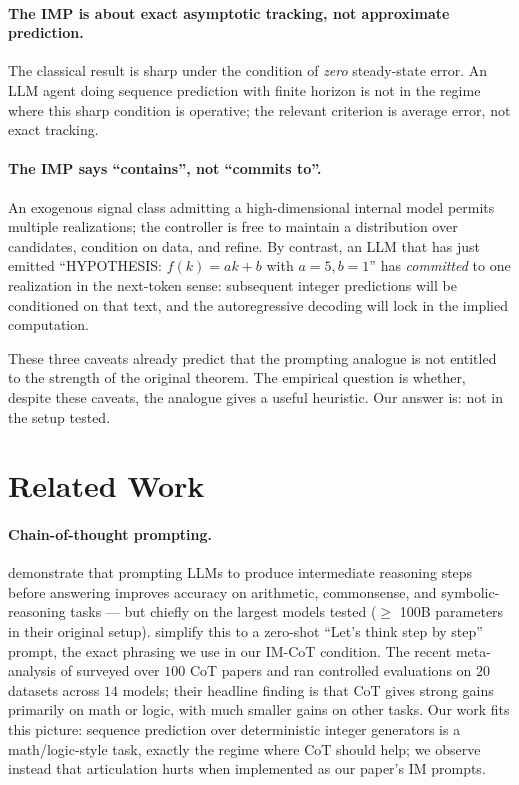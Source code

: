 \documentclass[11pt]{article}
\begin{document}
\paragraph{The IMP is about exact asymptotic tracking, not
approximate prediction.}  The classical result is sharp under the
condition of \emph{zero} steady-state error.  An LLM agent doing
sequence prediction with finite horizon is not in the regime where
this sharp condition is operative; the relevant criterion is
average error, not exact tracking.

\paragraph{The IMP says ``contains'', not ``commits to''.}  An
exogenous signal class admitting a high-dimensional internal model
permits multiple realizations; the controller is free to maintain a
distribution over candidates, condition on data, and refine.  By
contrast, an LLM that has just emitted ``HYPOTHESIS:
$f(k) = ak + b$ with $a = 5, b = 1$'' has \emph{committed} to one
realization in the next-token sense: subsequent integer predictions
will be conditioned on that text, and the autoregressive decoding
will lock in the implied computation.

These three caveats already predict that the prompting analogue is
not entitled to the strength of the original theorem.  The empirical
question is whether, despite these caveats, the analogue gives a
useful heuristic.  Our answer is: not in the setup tested.

\section{Related Work}
\label{sec:related}

\paragraph{Chain-of-thought prompting.}
\citet{wei2022chain} demonstrate that prompting LLMs to produce
intermediate reasoning steps before answering improves accuracy on
arithmetic, commonsense, and symbolic-reasoning tasks --- but
chiefly on the largest models tested ($\geq$ 100B parameters in
their original setup).  \citet{kojima2022zero} simplify this to a
zero-shot ``Let's think step by step'' prompt, the exact phrasing
we use in our IM-CoT condition.  The recent meta-analysis of
\citet{sprague2024cot} surveyed over $100$ CoT papers and ran
controlled evaluations on $20$ datasets across $14$ models; their
headline finding is that CoT gives strong gains primarily on math
or logic, with much smaller gains on other tasks.  Our work fits
this picture: sequence prediction over deterministic integer
generators is a math/logic-style task, exactly the regime where
CoT should help; we observe instead that articulation hurts when
implemented as our paper's IM prompts.
\end{document}
